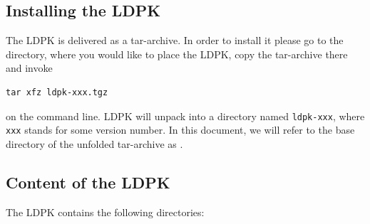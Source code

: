 \documentclass[10pt,a4paper]{article}
\begin{document}
\subsection{Installing the LDPK}
The LDPK is delivered as a tar-archive. In order to install it please go to the directory,
where you would like to place the LDPK, copy the tar-archive there and invoke
\begin{verbatim}
tar xfz ldpk-xxx.tgz
\end{verbatim}
on the command line. LDPK will unpack into a directory
named {\tt ldpk-xxx}, where {\tt xxx} stands for some version number.
In this document, we will refer to the base directory of the unfolded tar-archive as \ldpk.
%
\subsection{Content of the LDPK}
The LDPK contains the following directories:
\end{document}
